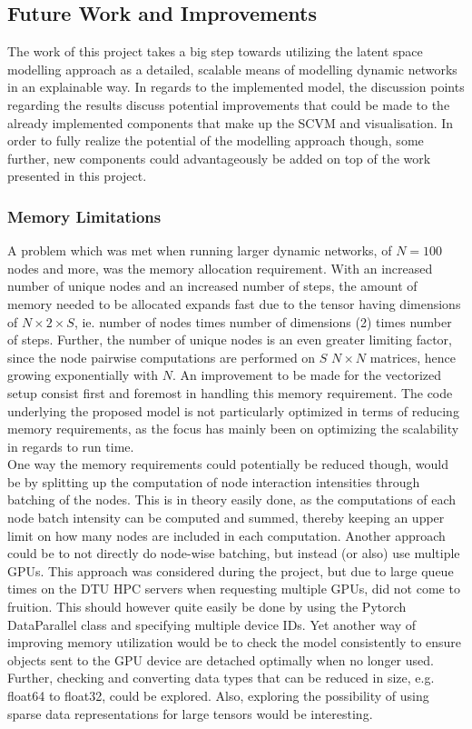 \subsection{Future Work and Improvements}
\label{sec:Discussion:FutureWork}
The work of this project takes a big step towards utilizing the latent space modelling approach as a detailed, scalable means of modelling dynamic networks in an explainable way.
In regards to the implemented model, the discussion points regarding the results discuss potential improvements that could be made to the already implemented components that make up the SCVM and visualisation. 
In order to fully realize the potential of the modelling approach though, some further, new components could advantageously be added on top of the work presented in this project.


\subsubsection{Memory Limitations}
\label{sec:Discussion:FutureWork:MemoryLimitations}
A problem which was met when running larger dynamic networks, of $N = 100$ nodes and more, was the memory allocation requirement.
With an increased number of unique nodes and an increased number of steps, the amount of memory needed to be allocated expands fast due to the tensor having dimensions of $N \times 2 \times S$, ie. number of nodes times number of dimensions (2) times number of steps. 
Further, the number of unique nodes is an even greater limiting factor, since the node pairwise computations are performed on $S$ $N \times N$ matrices, hence growing exponentially with $N$.
An improvement to be made for the vectorized setup consist first and foremost in handling this memory requirement. 
The code underlying the proposed model is not particularly optimized in terms of reducing memory requirements, as the focus has mainly been on optimizing the scalability in regards to run time. 
\\
One way the memory requirements could potentially be reduced though, would be by splitting up the computation of node interaction intensities through batching of the nodes. 
This is in theory easily done, as the computations of each node batch intensity can be computed and summed, thereby keeping an upper limit on how many nodes are included in each computation. 
Another approach could be to not directly do node-wise batching, but instead (or also) use multiple GPUs. 
This approach was considered during the project, but due to large queue times on the DTU HPC servers when requesting multiple GPUs, did not come to fruition. 
This should however quite easily be done by using the Pytorch DataParallel \cite{DataParallelDocumentation} class and specifying multiple device IDs. 
Yet another way of improving memory utilization would be to check the model consistently to ensure objects sent to the GPU device are detached optimally when no longer used.
Further, checking and converting data types that can be reduced in size, e.g. float64 to float32, could be explored.
Also, exploring the possibility of using sparse data representations \cite{Torch.sparseDocumentation} for large tensors would be interesting.


